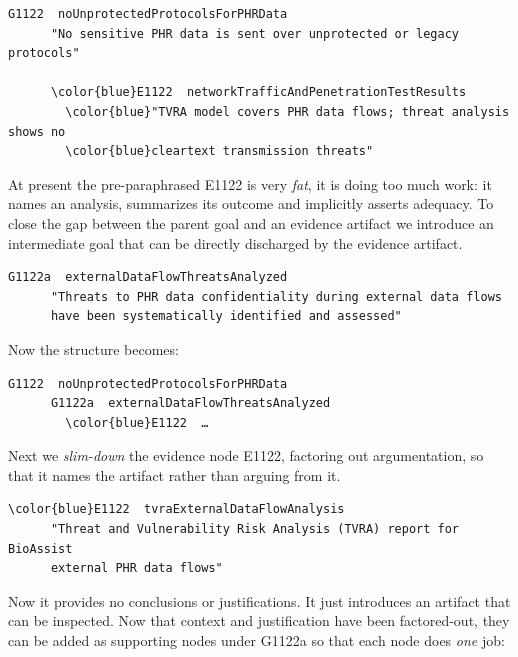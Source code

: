 \documentclass{article}
\begin{document}
\begin{Verbatim}[commandchars=\\\{\}]
    G1122  noUnprotectedProtocolsForPHRData
      "No sensitive PHR data is sent over unprotected or legacy protocols"
    
      \color{blue}E1122  networkTrafficAndPenetrationTestResults
        \color{blue}"TVRA model covers PHR data flows; threat analysis shows no
        \color{blue}cleartext transmission threats"
\end{Verbatim}
At present the pre-paraphrased E1122 is very \emph{fat}, it is doing too much work: it names an analysis, summarizes its outcome and implicitly asserts adequacy. To close the gap between the parent goal and an evidence artifact we introduce an intermediate goal that can be directly discharged by the evidence artifact.
\begin{Verbatim}[commandchars=\\\{\}]
    G1122a  externalDataFlowThreatsAnalyzed
      "Threats to PHR data confidentiality during external data flows
      have been systematically identified and assessed"
\end{Verbatim}
Now the structure becomes:
\begin{Verbatim}[commandchars=\\\{\}]
    G1122  noUnprotectedProtocolsForPHRData
      G1122a  externalDataFlowThreatsAnalyzed
        \color{blue}E1122  …
\end{Verbatim}
Next we \emph{slim-down} the evidence node E1122, factoring out argumentation, so that it names the artifact rather than arguing from it.
\begin{Verbatim}[commandchars=\\\{\}]
    \color{blue}E1122  tvraExternalDataFlowAnalysis
      "Threat and Vulnerability Risk Analysis (TVRA) report for BioAssist
      external PHR data flows"
\end{Verbatim}
Now it provides no conclusions or justifications.
It just introduces an artifact that can be inspected.
Now that context and justification have been factored-out, they can be added
as supporting nodes under G1122a so that each node does \emph{one} job:
\end{document}
